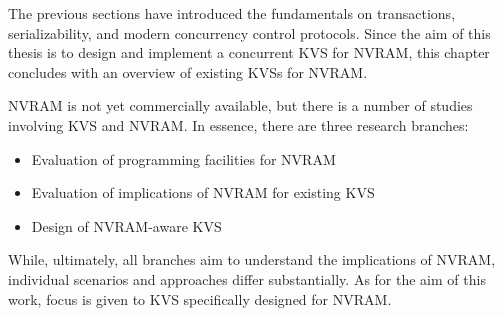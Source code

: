 
The previous sections have introduced the fundamentals on transactions,
serializability, and modern concurrency control protocols.  Since the aim of
this thesis is to design and implement a concurrent \ac{KVS} for \ac{NVRAM},
this chapter concludes with an overview of existing \acp{KVS} for \ac{NVRAM}.

\ac{NVRAM} is not yet commercially available, but there is a number of studies
involving \ac{KVS} and \ac{NVRAM}. In essence, there are three research
branches:

\begin{itemize}
    \item Evaluation of programming facilities for \ac{NVRAM}
    \item Evaluation of implications of \ac{NVRAM} for existing \ac{KVS}
    \item Design of \ac{NVRAM}-aware \ac{KVS}
\end{itemize}

While, ultimately, all branches aim to understand the implications of
\ac{NVRAM}, individual scenarios and approaches differ substantially. As for the
aim of this work, focus is given to \ac{KVS} specifically designed for
\ac{NVRAM}.



